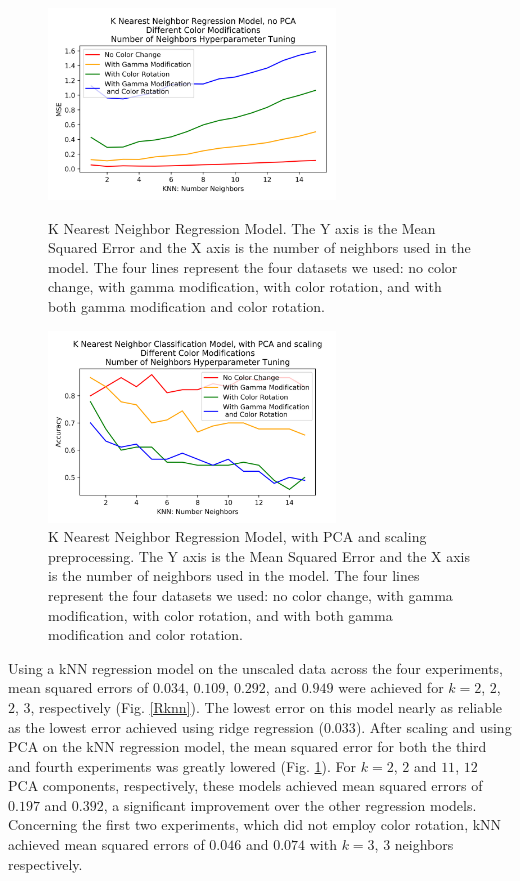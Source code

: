 \documentclass[journal]{IEEEtran}
\begin{document}
\begin{figure}
\centering
\includegraphics[height=2in]{KNN_reg_noPCA/knn_regression.png}
\caption{K Nearest Neighbor Regression Model. The Y axis is the Mean Squared Error and the X axis is the number of neighbors used in the model. The four lines represent the four datasets we used: no color change, with gamma modification, with color rotation, and with both gamma modification and color rotation.}
\label{Rknn}

\centering
\includegraphics[height=2in]{KNN_clf_PCA/knn_classification.png}
\caption{K Nearest Neighbor Regression Model, with PCA and scaling preprocessing. The Y axis is the Mean Squared Error and the X axis is the number of neighbors used in the model. The four lines represent the four datasets we used: no color change, with gamma modification, with color rotation, and with both gamma modification and color rotation.}
\label{Rknn_pca}
\end{figure}

Using a kNN regression model on the unscaled data across the four experiments, mean squared errors of $0.034$, $0.109$, $0.292$, and $0.949$ were achieved for $k=2$, $2$, $2$, $3$, respectively (Fig. \ref{Rknn}). The lowest error on this model nearly as reliable as the lowest error achieved using ridge regression ($0.033$). After scaling and using PCA on the kNN regression model, the mean squared error for both the third and fourth experiments was greatly lowered (Fig. \ref{Rknn_pca}). For $k=2$, $2$ and $11$, $12$ PCA components, respectively, these models achieved mean squared errors of $0.197$ and $0.392$, a significant improvement over the other regression models. Concerning the first two experiments, which did not employ color rotation, kNN achieved mean squared errors of $0.046$ and $0.074$ with $k=3$, $3$ neighbors respectively.
\end{document}
